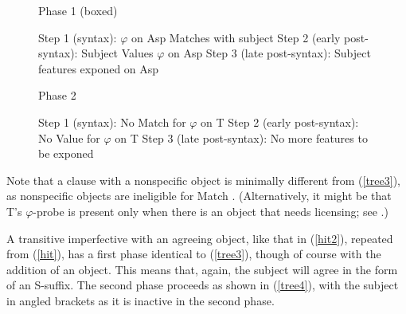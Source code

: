 \documentclass[output=paper
,modfonts
,nonflat]{langsci/langscibook}
\begin{document}
\begin{figure}
\eal \label{layout1}
\ex Phase 1 (boxed)
\begin{xlist}
\ex Step 1 (syntax): $\varphi$ on Asp Matches with subject
\ex Step 2 (early post-syntax): Subject Values $\varphi$ on Asp
\ex Step 3 (late post-syntax): Subject features exponed on Asp
\end{xlist}
\ex Phase 2
\begin{xlist}
\ex Step 1 (syntax): No Match for $\varphi$ on T
\ex Step 2 (early post-syntax): No Value for $\varphi$ on T
\ex Step 3 (late post-syntax): No more features to be exponed
\end{xlist}
\zl \vspace{-0.4cm}
\end{figure}
\noindent Note that a clause with a nonspecific object is minimally different from (\ref{tree3}), as nonspecific objects are ineligible for Match \citep{KalinvanUrk15}. (Alternatively, it might be that T's $\varphi$-probe is present only when there is an object that needs licensing; see \citealt{Kalin18}.)

A transitive imperfective with an agreeing object, like that in (\ref{hit2}), repeated from (\ref{hit}), has a first phase identical to (\ref{tree3}), though of course with the addition of an object. This means that, again, the subject will agree in the form of an S-suffix. The second phase proceeds as shown in (\ref{tree4}), with the subject in angled brackets as it is inactive in the second phase.

\z \vspace{-0.2cm}
\end{document}
